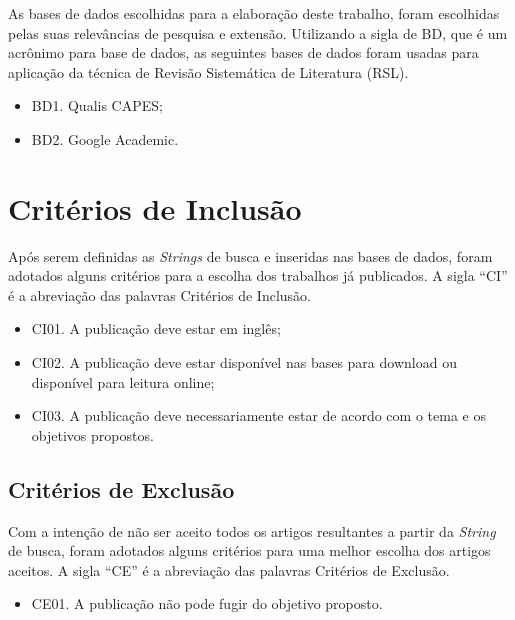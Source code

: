 As bases de dados escolhidas para a elaboração deste trabalho, foram escolhidas pelas suas relevâncias de pesquisa e extensão. Utilizando a sigla de BD, que é um acrônimo para base de dados, as seguintes bases de dados foram usadas para aplicação da técnica de Revisão Sistemática de Literatura (RSL).

\begin{itemize}
    \item BD1. Qualis CAPES;
    \item BD2. Google Academic.
\end{itemize} 

\section{Critérios de Inclusão}

Após serem definidas as \textit{Strings} de busca e inseridas nas bases de dados, foram adotados alguns critérios para a escolha dos trabalhos já publicados. A sigla “CI” é a abreviação das palavras Critérios de Inclusão.

\begin{itemize}
    \item CI01. A publicação deve estar em inglês;
    \item CI02. A publicação deve estar disponível nas bases para download ou disponível para leitura online;
    \item CI03. A publicação deve necessariamente estar de acordo com o tema e os objetivos propostos.
\end{itemize}

\subsection{Critérios de Exclusão}

Com a intenção de não ser aceito todos os artigos resultantes a partir da \textit{String} de busca, foram adotados alguns critérios para uma melhor escolha dos artigos aceitos. A sigla “CE” é a abreviação das palavras Critérios de Exclusão. 

\begin{itemize}
    \item CE01. A publicação não pode fugir do objetivo proposto.
\end{itemize}

